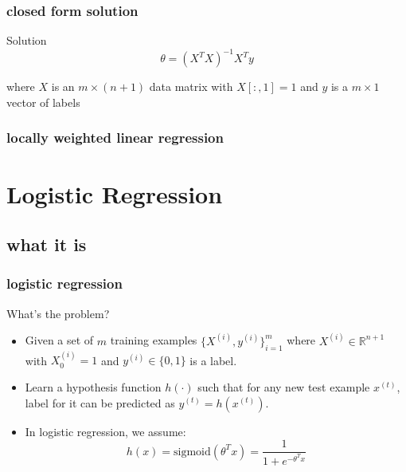 \documentclass[11pt]{beamer}
\begin{document}
\begin{frame}
	\frametitle{closed form solution}
	\begin{block}{Solution}
	\begin{equation*}	
		\theta = (X^T X)^{-1} X^T y 
	\end{equation*} 

	where $X$ is an $m \times (n+1)$ data matrix with $X[:,1] = 1$ and $y$ is a $m \times 1$ vector of labels
   	\end{block}
\end{frame}

\begin{frame}
	\frametitle{locally weighted linear regression}
\end{frame}

\section{Logistic Regression}
\subsection{what it is}
\begin{frame}
	\frametitle{\textbf{logistic regression}}
	
	\begin{block}{What's the problem?}
	\begin{itemize}
		\item Given a set of $m$ training examples $\{X^{(i)}, y^{(i)}\}_{i=1}^m$ 
		where $X^{(i)} \in \mathbb{R}^{n+1}$
		with $X^{(i)}_0 = 1$ and $y^{(i)} \in \{0, 1\}$ is a label.
		\item Learn a hypothesis function $h(\cdot)$ such that for any new test example $x^{(t)}$, label for it can be predicted as 
		$y^{(t)} = h(x^{(t)})$.
		\item In logistic regression, we assume:
		\begin{equation*}
		h(x) = \textrm{sigmoid}(\theta^T x) = \frac{1}{1 + e^{-\theta^T x}}
		\end{equation*}
	\end{itemize}
	\end{block}
\end{frame}
\end{document}
